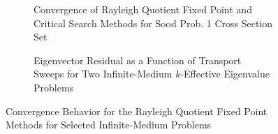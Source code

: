\begin{figure}[!htbp]
	\centering
	\noindent\begin{subfigure}[!htbp]{0.5\textheight}
		\centering
		\resizebox{1.0\textwidth}{!}{
		
	}
	\caption{Convergence of Rayleigh Quotient Fixed Point and Critical Search Methods for Sood Prob. 1 Cross Section Set}
	\label{fig:AlphaInfConv}
	\end{subfigure}
	\noindent\begin{subfigure}[!htbp]{0.5\textheight}
	\centering
	\resizebox{1.0\textwidth}{!}{
		
	}
	\caption{Eigenvector Residual as a Function of Transport Sweeps for Two Infinite-Medium $k$-Effective Eigenvalue Problems}
	\label{fig:kRes}
	\end{subfigure}
	\caption{Convergence Behavior for the Rayleigh Quotient Fixed Point Methods for Selected Infinite-Medium Problems}
\end{figure}

%		



